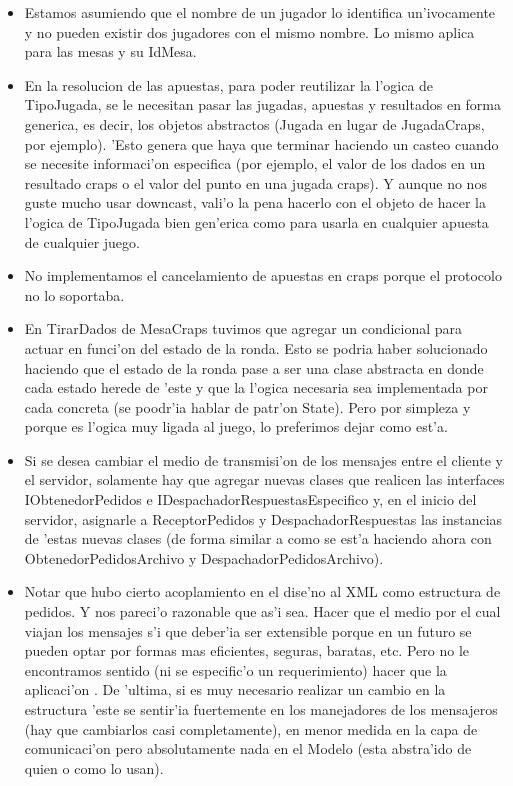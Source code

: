 \begin{itemize}
\item Estamos asumiendo que el nombre de un jugador lo identifica un'ivocamente y no pueden existir dos jugadores con el mismo nombre. Lo mismo aplica para las mesas y su IdMesa.

\item En la resolucion de las apuestas, para poder reutilizar la l'ogica de TipoJugada, se le necesitan pasar las jugadas, apuestas y resultados en forma generica, es decir, los objetos abstractos (Jugada en lugar de JugadaCraps, por ejemplo). 'Esto genera que haya que terminar haciendo un casteo cuando se necesite informaci'on especifica (por ejemplo, el valor de los dados en un resultado craps o el valor del punto en una jugada craps). Y aunque no nos guste mucho usar downcast, vali'o la pena hacerlo con el objeto de hacer la l'ogica de TipoJugada bien gen'erica como para usarla en cualquier apuesta de cualquier juego.

\item No implementamos el cancelamiento de apuestas en craps porque el protocolo no lo soportaba.

\item En TirarDados de MesaCraps tuvimos que agregar un condicional para actuar en funci'on del estado de la ronda. Esto se podria haber solucionado haciendo que el estado de la ronda pase a ser una clase abstracta en donde cada estado herede de 'este y que la l'ogica necesaria sea implementada por cada concreta (se poodr'ia hablar de patr'on State). Pero por simpleza y porque es l'ogica muy ligada al juego, lo preferimos dejar como est'a.

\item Si se desea cambiar el medio de transmisi'on de los mensajes entre el cliente y el servidor, solamente hay que agregar nuevas clases que realicen las interfaces IObtenedorPedidos e IDespachadorRespuestasEspecifico y, en el inicio del servidor, asignarle a ReceptorPedidos y DespachadorRespuestas las instancias de 'estas nuevas clases (de forma similar a como se est'a haciendo ahora con ObtenedorPedidosArchivo y DespachadorPedidosArchivo).

\item Notar que hubo cierto acoplamiento en el dise'no al XML como estructura de pedidos. Y nos pareci'o razonable que as'i sea. Hacer que el medio por el cual viajan los mensajes s'i que deber'ia ser extensible porque en un futuro se pueden optar por formas mas eficientes, seguras, baratas, etc. Pero no le encontramos sentido (ni se especific'o un requerimiento) hacer que la aplicaci'on . De 'ultima, si es muy necesario realizar un cambio en la estructura 'este se sentir'ia fuertemente en los manejadores de los mensajeros (hay que cambiarlos casi completamente), en menor medida en la capa de comunicaci'on pero absolutamente nada en el Modelo (esta abstra'ido de quien o como lo usan).

\end{itemize}



